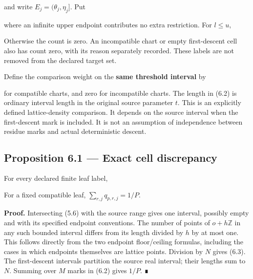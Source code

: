 
and write \(E_j=(\theta_j,\eta_j]\). Put


where an infinite upper endpoint contributes no extra restriction. For
\(l\le u\),


Otherwise the count is zero. An incompatible chart or empty
first-descent cell also has count zero, with its reason separately
recorded. These labels are not removed from the declared target set.

Define the comparison weight on the \textbf{same threshold interval} by

\SourceMath{q_\lambda=
 \frac{|[b,b+N)\cap E_j(p)|}{NMP}}{6.2}

for compatible charts, and zero for incompatible charts. The length in
(6.2) is ordinary interval length in the original source parameter
\(t\). This is an explicitly defined lattice-density comparison. It
depends on the source interval when the first-descent mark is included.
It is not an assumption of independence between residue marks and actual
deterministic descent.

\subsection{Proposition 6.1 --- Exact cell discrepancy}

For every declared finite leaf label,


For a fixed compatible leaf, \(\sum_{r,j}q_{p,r,j}=1/P\).

\textbf{Proof.} Intersecting (5.6) with the source range gives one
interval, possibly empty and with its specified endpoint conventions.
The number of points of \(o+h\mathbb Z\) in any such bounded interval
differs from its length divided by \(h\) by at most one. This follows
directly from the two endpoint floor/ceiling formulas, including the
cases in which endpoints themselves are lattice points. Division by
\(N\) gives (6.3). The first-descent intervals partition the source real
interval; their lengths sum to \(N\). Summing over \(M\) marks in (6.2)
gives \(1/P\). ∎

